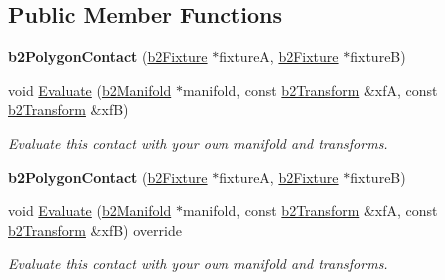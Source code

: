 \subsection*{Public Member Functions}
\begin{DoxyCompactItemize}
\item 
\mbox{\label{classb2PolygonContact_a93cabf086e75ae40dcd1881760c71c63}} 
{\bfseries b2\+Polygon\+Contact} (\hyperlink{classb2Fixture}{b2\+Fixture} $\ast$fixtureA, \hyperlink{classb2Fixture}{b2\+Fixture} $\ast$fixtureB)
\item 
\mbox{\label{classb2PolygonContact_ae75f78bb52c76fc4fffda4d91e62d354}} 
void \hyperlink{classb2PolygonContact_ae75f78bb52c76fc4fffda4d91e62d354}{Evaluate} (\hyperlink{structb2Manifold}{b2\+Manifold} $\ast$manifold, const \hyperlink{structb2Transform}{b2\+Transform} \&xfA, const \hyperlink{structb2Transform}{b2\+Transform} \&xfB)
\begin{DoxyCompactList}\small\item\em Evaluate this contact with your own manifold and transforms. \end{DoxyCompactList}\item 
\mbox{\label{classb2PolygonContact_a93cabf086e75ae40dcd1881760c71c63}} 
{\bfseries b2\+Polygon\+Contact} (\hyperlink{classb2Fixture}{b2\+Fixture} $\ast$fixtureA, \hyperlink{classb2Fixture}{b2\+Fixture} $\ast$fixtureB)
\item 
\mbox{\label{classb2PolygonContact_aa9581ba4a2bc769b80e3f107801d0950}} 
void \hyperlink{classb2PolygonContact_aa9581ba4a2bc769b80e3f107801d0950}{Evaluate} (\hyperlink{structb2Manifold}{b2\+Manifold} $\ast$manifold, const \hyperlink{structb2Transform}{b2\+Transform} \&xfA, const \hyperlink{structb2Transform}{b2\+Transform} \&xfB) override
\begin{DoxyCompactList}\small\item\em Evaluate this contact with your own manifold and transforms. \end{DoxyCompactList}\end{DoxyCompactItemize}
